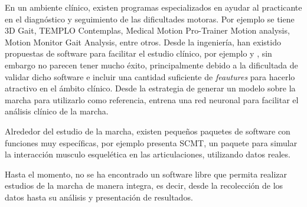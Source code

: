 En un ambiente clínico, existen programas especializados en ayudar al practicante en el diagnóstico y seguimiento de las dificultades motoras. Por ejemplo se tiene 3D Gait, TEMPLO Contemplas, Medical Motion Pro-Trainer Motion analysis, Motion Monitor Gait Analysis, entre otros. Desde la ingeniería, han existido propuestas de software para facilitar el estudio clínico, por ejemplo \cite{hayla} y \cite{senanayake}, sin embargo no parecen tener mucho éxito, principalmente debido a la dificultada de validar dicho software e incluir una cantidad suficiente de \emph{feautures} para hacerlo atractivo en el ámbito clínico. Desde la estrategia de generar un modelo sobre la marcha para utilizarlo como referencia, \cite{vieira} entrena una red neuronal para facilitar el análisis clínico de la marcha.

Alrededor del estudio de la marcha, existen pequeños paquetes de software con funciones muy específicas, por ejemplo \cite{eskinazi} presenta SCMT, un paquete para simular la interacción musculo esquelética en las articulaciones, utilizando datos reales.

Hasta el momento, no se ha encontrado un software libre que permita realizar estudios de la marcha de manera integra, es decir, desde la recolección de los datos hasta su análisis y presentación de resultados. 


